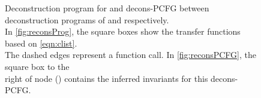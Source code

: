 \begin{figure}[t]
\begin{tabular}{cc}
\\
\end{tabular}
\caption{\label{fig:recons}Deconstruction program for  and decons-PCFG between deconstruction programs of  and  respectively. \\
In \cref{fig:reconsProg}, the square boxes show the transfer functions based on \cref{eqn:clist}.\\
The dashed edges represent a function call. In \cref{fig:reconsPCFG}, the square box to the \\ right of node () contains the inferred invariants for this decons-PCFG.}
\end{figure}
